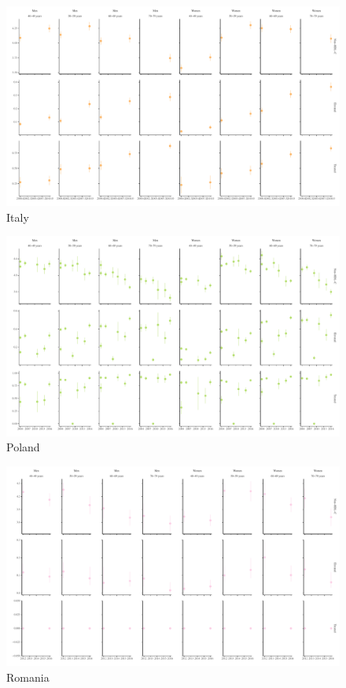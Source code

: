 \documentclass[12pt]{article}
\begin{document}
\begin{appendix}
\begin{landscape}
        \begin{figure}[H]
            \centering
            \includegraphics[width=\linewidth]{../3_figures/countries/fig_italy.pdf}
            \caption{Italy}
            \label{fig:italy}
        \end{figure}

        \begin{figure}[H]
            \centering
            \includegraphics[width=\linewidth]{../3_figures/countries/fig_poland.pdf}
            \caption{Poland}
            \label{fig:poland}
        \end{figure}

        \begin{figure}[H]
            \centering
            \includegraphics[width=\linewidth]{../3_figures/countries/fig_romania.pdf}
            \caption{Romania}
            \label{fig:romania}
        \end{figure}


\end{landscape}
\end{appendix}
\end{document}
